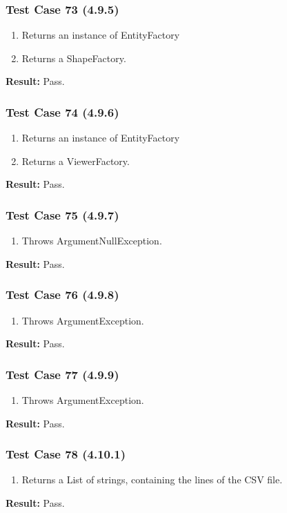 \documentclass[a4paper,12pt]{article}
\begin{document}
		\subsubsection{Test Case 73 (4.9.5)}
				\begin{enumerate}
					\item Returns an instance of EntityFactory
					\item Returns a ShapeFactory.
				\end{enumerate}
			\textbf{Result: }Pass.
		\subsubsection{Test Case 74 (4.9.6)}
				\begin{enumerate}
					\item Returns an instance of EntityFactory
					\item Returns a ViewerFactory.
				\end{enumerate}
			\textbf{Result: }Pass.
		\subsubsection{Test Case 75 (4.9.7)}
				\begin{enumerate}
					\item Throws ArgumentNullException.
				\end{enumerate}
			\textbf{Result: }Pass.
		\subsubsection{Test Case 76 (4.9.8)}
				\begin{enumerate}
					\item Throws ArgumentException.
				\end{enumerate}
			\textbf{Result: }Pass.
		\subsubsection{Test Case 77 (4.9.9)}
				\begin{enumerate}
					\item Throws ArgumentException.
				\end{enumerate}
			\textbf{Result: }Pass.
		\subsubsection{Test Case 78 (4.10.1)}
				\begin{enumerate}
					\item Returns a List of strings, containing the lines of the CSV ﬁle.
				\end{enumerate}
			\textbf{Result: }Pass.
\end{document}
